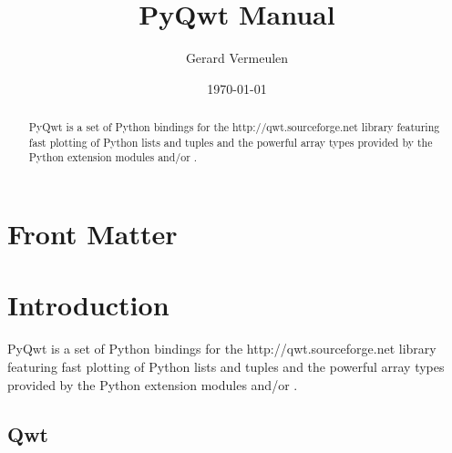 \documentclass{manual}
\title{PyQwt Manual}
\author{Gerard Vermeulen}
\date{\today}
\newcommand{\Qwt}{\ulink{Qwt}
  {http://qwt.sourceforge.net}}
\begin{document}
\maketitle

\ifhtml
\chapter*{Front Matter \label{front}}
\fi




\begin{abstract}

\noindent
PyQwt is a set of Python bindings for the \Qwt{} library featuring fast
plotting of Python lists and tuples and the powerful array types provided
by the Python extension modules  and/or .

\end{abstract}

\tableofcontents

\chapter{Introduction \label{introduction}}

PyQwt is a set of Python bindings for the \Qwt{} library featuring fast
plotting of Python lists and tuples and the powerful array types provided
by the Python extension modules  and/or .


 

\section{Qwt \label{qwt-intro}}
\end{document}
